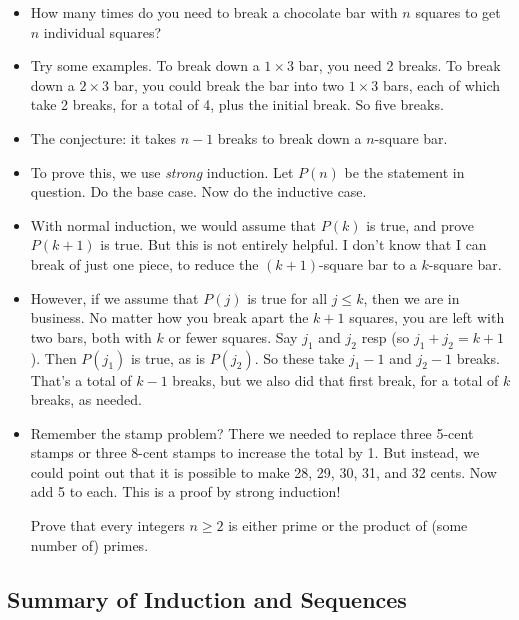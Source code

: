 \documentclass[12pt]{article}
\theoremstyle{plain}
\theoremstyle{definition}
\theoremstyle{remark}
\newcommand{\ex}{\noindent{\bf Ex: }}
\newcommand{\todayis}[1]{\clearpage{\rhead{\footnotesize #1}}}
\begin{document}
\begin{itemize}
	\item How many times do you need to break a chocolate bar with $n$ squares to get $n$ individual squares?

	\item Try some examples.  To break down a $1\times 3$ bar, you need 2 breaks.  To break down a $2\times 3$ bar, you could break the bar into two $1\times 3$ bars, each of which take 2 breaks, for a total of 4, plus the initial break.  So five breaks.

  \item The conjecture: it takes $n-1$ breaks to break down a $n$-square bar.

  \item To prove this, we use \emph{strong} induction.  Let $P(n)$ be the statement in question.  Do the base case.  Now do the inductive case.

  \item With normal induction, we would assume that $P(k)$ is true, and prove $P(k+1)$ is true.  But this is not entirely helpful.  I don't know that I can break of just one piece, to reduce the $(k+1)$-square bar to a $k$-square bar.

  \item However, if we assume that $P(j)$ is true for all $j \le k$, then we are in business.  No matter how you break apart the $k+1$ squares, you are left with two bars, both with $k$ or fewer squares.  Say $j_1$ and $j_2$ resp (so $j_1 + j_2 = k+1$).  Then $P(j_1)$ is true, as is $P(j_2)$.  So these take $j_1 - 1$ and $j_2 - 1$ breaks.  That's a total of $k-1$ breaks, but we also did that first break, for a total of $k$ breaks, as needed.

  \item Remember the stamp problem?  There we needed to replace three 5-cent stamps or three 8-cent stamps to increase the total by 1.  But instead, we could point out that it is possible to make 28, 29, 30, 31, and 32 cents.  Now add 5 to each.  This is a proof by strong induction!

  \ex Prove that every integers $n \ge 2$ is either prime or the product of (some number of) primes.




\end{itemize}


\todayis{Wednesday, October 18}


\subsection*{Summary of Induction and Sequences}
\end{document}
